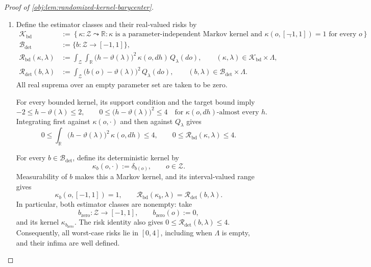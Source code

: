 \begin{proof}[Proof of \cref{obj:lem:randomized-kernel-barycenter}]
\begin{enumerate}
\item Define the estimator classes and their real-valued risks by
\[
\begin{aligned}
\mathcal K_{\mathrm{bd}}
&:=
\left\{\kappa:\mathcal Z\leadsto\mathbb R:
\kappa\text{ is a parameter-independent Markov kernel and }
\kappa(o,[-1,1])=1\text{ for every }o\right\},\\
\mathcal B_{\mathrm{det}}
&:=\{b:\mathcal Z\to[-1,1]\},\\
\mathcal R_{\mathrm{bd}}(\kappa,\lambda)
&:=
\int_{\mathcal Z}\int_{\mathbb R}
\bigl(h-\vartheta(\lambda)\bigr)^2\,\kappa(o,dh)\,Q_\lambda(do),
\qquad (\kappa,\lambda)\in\mathcal K_{\mathrm{bd}}\times\Lambda,\\
\mathcal R_{\mathrm{det}}(b,\lambda)
&:=
\int_{\mathcal Z}\bigl(b(o)-\vartheta(\lambda)\bigr)^2\,Q_\lambda(do),
\qquad (b,\lambda)\in\mathcal B_{\mathrm{det}}\times\Lambda.
\end{aligned}
\]
All real suprema over an empty parameter set are taken to be zero.

For every bounded kernel, its support condition and the target bound imply
\[
-2\le h-\vartheta(\lambda)\le2,
\qquad
0\le\bigl(h-\vartheta(\lambda)\bigr)^2\le4
\quad\text{for }\kappa(o,dh)\text{-almost every }h.
\]
Integrating first against \(\kappa(o,\cdot)\) and then against \(Q_\lambda\) gives
\[
0\le
\int_{\mathbb R}\bigl(h-\vartheta(\lambda)\bigr)^2\,\kappa(o,dh)
\le4,
\qquad
0\le\mathcal R_{\mathrm{bd}}(\kappa,\lambda)\le4.
\]

For every \(b\in\mathcal B_{\mathrm{det}}\), define its deterministic kernel by
\[
\kappa_b(o,\cdot):=\delta_{b(o)},
\qquad o\in\mathcal Z.
\]
Measurability of \(b\) makes this a Markov kernel, and its interval-valued range gives
\[
\kappa_b(o,[-1,1])=1,
\qquad
\mathcal R_{\mathrm{bd}}(\kappa_b,\lambda)
=\mathcal R_{\mathrm{det}}(b,\lambda).
\]
In particular, both estimator classes are nonempty: take
\[
b_{\mathrm{zero}}:\mathcal Z\to[-1,1],
\qquad b_{\mathrm{zero}}(o):=0,
\]
and its kernel \(\kappa_{b_{\mathrm{zero}}}\). The risk identity also gives
\(0\le\mathcal R_{\mathrm{det}}(b,\lambda)\le4\).
Consequently, all worst-case risks lie in \([0,4]\), including when
\(\Lambda\) is empty, and their infima are well defined.


\end{enumerate}
\end{proof}
